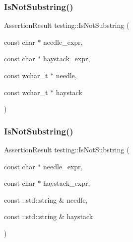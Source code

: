 \mbox{\label{namespacetesting_a53e5c6e91ea429c43de7f4f57e33d166}} 
\subsubsection{\texorpdfstring{IsNotSubstring()}{IsNotSubstring()}\hspace{0.1cm}{\footnotesize\ttfamily [2/3]}}
{\footnotesize\ttfamily Assertion\+Result testing\+::\+Is\+Not\+Substring (\begin{DoxyParamCaption}\item[{const char $\ast$}]{needle\+\_\+expr,  }\item[{const char $\ast$}]{haystack\+\_\+expr,  }\item[{const wchar\+\_\+t $\ast$}]{needle,  }\item[{const wchar\+\_\+t $\ast$}]{haystack }\end{DoxyParamCaption})}

\mbox{\label{namespacetesting_abe7b3fa1c9528745f934d4a14155ea87}} 
\subsubsection{\texorpdfstring{IsNotSubstring()}{IsNotSubstring()}\hspace{0.1cm}{\footnotesize\ttfamily [3/3]}}
{\footnotesize\ttfamily Assertion\+Result testing\+::\+Is\+Not\+Substring (\begin{DoxyParamCaption}\item[{const char $\ast$}]{needle\+\_\+expr,  }\item[{const char $\ast$}]{haystack\+\_\+expr,  }\item[{const \+::std\+::string \&}]{needle,  }\item[{const \+::std\+::string \&}]{haystack }\end{DoxyParamCaption})}

\mbox{\label{namespacetesting_a390c4f66fe7e9098117eb77e5fffa4ad}} 
